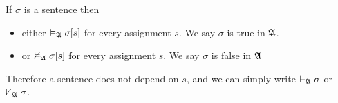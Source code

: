 \begin{corollary}
    If $\sigma$ is a sentence then
    \begin{itemize}
        \item either $\vDash_{\mathfrak{A}}\sigma[s]$ for every assignment $s$. We say $\sigma$ is true in $\mathfrak{A}$.
        \item or $\nvDash_{\mathfrak{A}}\sigma[s]$ for every assignment $s$. We say $\sigma$ is false in $\mathfrak{A}$
    \end{itemize}
\end{corollary}

Therefore a sentence does not depend on $s$, and we can simply write $\vDash_{\mathfrak{A}}\sigma$ or $\nvDash_{\mathfrak{A}}\sigma$.
